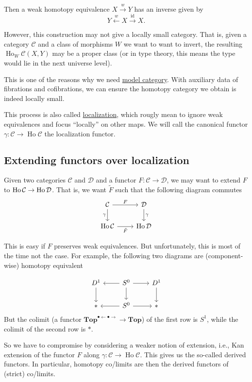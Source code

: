 \documentclass[11pt]{article}
\newcommand{\Ho}{\operatorname{Ho}}
\newcommand{\id}{\operatorname{id}}
\newcommand{\Top}{\mathbf{Top}}
\newcommand{\calC}{\mathcal{C}}
\newcommand{\calD}{\mathcal{D}}
\begin{document}
Then a weak homotopy equivalence $X \stackrel{w}{\to} Y$ has an inverse given by
$$Y \stackrel{w}{\leftarrow} X \stackrel{\id}{\to} X.$$

However, this construction may not give a locally small category.
That is, given a category $\mathcal C$ and a class of morphisms $W$ we want to want to invert,
the resulting $\Ho_W \mathcal C(X,Y)$ may be a proper class
(or in type theory, this means the type would lie in the next universe level).

This is one of the reasons why we need
\href{https://ncatlab.org/nlab/show/model+category}{model category}.
With auxiliary data of fibrations and cofibrations,
we can ensure the homotopy category we obtain is indeed locally small.

This process is also called \href{https://ncatlab.org/nlab/show/localization}{localization},
which rougly mean to ignore weak equivalences and focus ``locally'' on other maps.
We will call the canonical functor $\gamma : \calC \to \Ho \calC$ the localization functor.

\subsection{Extending functors over localization}
Given two categories $\calC$ and $\calD$ and a functor $F : \calC \to \calD$,
we may want to extend $F$ to $\Ho\cal C \to \Ho\cal D$.
That is, we want $\tilde F$ such that the following diagram commutes
\[\begin{tikzcd}
\calC \arrow[r,"F"] \arrow[d,"\gamma"'] & \calD \arrow[d,"\gamma"] \\
\Ho \calC \arrow[r,"\tilde{F}"'] & \Ho \calD
\end{tikzcd}\]

This is easy if $F$ preserves weak equivalences.
But unfortunately, this is most of the time not the case.
For example, the following two diagrams are (component-wise) homotopy equivalent

\[
\begin{tikzcd}
    D ^ 1 \arrow[d] & S ^ 0 \arrow[l] \arrow[r] \arrow[d] & D ^1 \arrow[d] \\
    * & S ^ 0 \arrow[l] \arrow[r] & *
\end{tikzcd}
\]
But the colimit (a functor $\Top^{\bullet \leftarrow \bullet \rightarrow} \to \Top$) of the first row
is $S^1$, while the colimit of the second row is $*$. 

So we have to compromise by considering a weaker notion of extension,
i.e., Kan extension of the functor $F$ along $\gamma: \calC \to \Ho\calC$.
This gives us the so-called derived functors.
In particular, homotopy co/limits are then the derived functors of (strict) co/limits.
\end{document}
